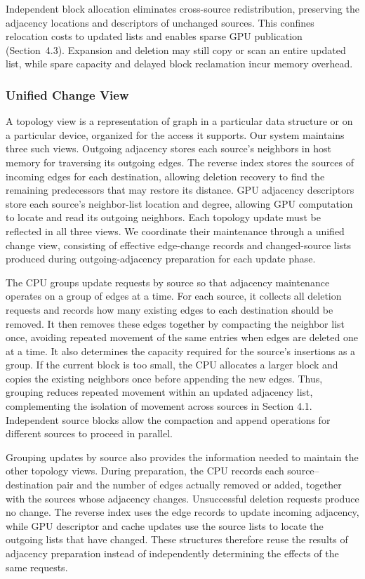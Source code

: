 Independent block allocation eliminates cross-source redistribution, preserving the adjacency locations and descriptors of unchanged sources. This confines relocation costs to updated lists and enables sparse GPU publication (Section~4.3). Expansion and deletion may still copy or scan an entire updated list, while spare capacity and delayed block reclamation incur memory overhead.

\subsubsection{Unified Change View}
\label{sec:change-view}


A topology view is a representation of graph in a particular data structure or on a particular device, organized for the access it supports. Our system maintains three such views. Outgoing adjacency stores each source's neighbors in host memory for traversing its outgoing edges. The reverse index stores the sources of incoming edges for each destination, allowing deletion recovery to find the remaining predecessors that may restore its distance. GPU adjacency descriptors store each source's neighbor-list location and degree, allowing GPU computation to locate and read its outgoing neighbors. Each topology update must be reflected in all three views. We coordinate their maintenance through a unified change view, consisting of effective edge-change records and changed-source lists produced during outgoing-adjacency preparation for each update phase.

The CPU groups update requests by source so that adjacency maintenance operates on a group of edges at a time. For each source, it collects all deletion requests and records how many existing edges to each destination should be removed. It then removes these edges together by compacting the neighbor list once, avoiding repeated movement of the same entries when edges are deleted one at a time. It also determines the capacity required for the source's insertions as a group. If the current block is too small, the CPU allocates a larger block and copies the existing neighbors once before appending the new edges. Thus, grouping reduces repeated movement within an updated adjacency list, complementing the isolation of movement across sources in Section 4.1. Independent source blocks allow the compaction and append operations for different sources to proceed in parallel.

Grouping updates by source also provides the information needed to maintain the other topology views. During preparation, the CPU records each source--destination pair and the number of edges actually removed or added, together with the sources whose adjacency changes. Unsuccessful deletion requests produce no change. The reverse index uses the edge records to update incoming adjacency, while GPU descriptor and cache updates use the source lists to locate the outgoing lists that have changed. These structures therefore reuse the results of adjacency preparation instead of independently determining the effects of the same requests.


